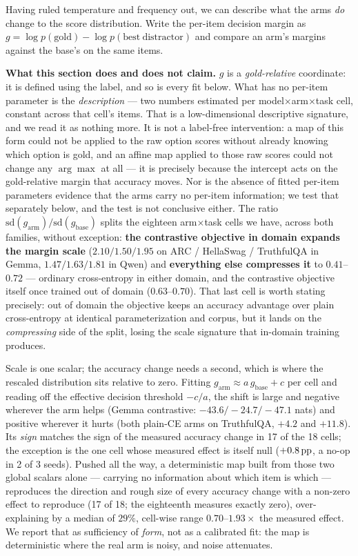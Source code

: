 Having ruled temperature and frequency out, we can describe what the arms \emph{do}
change to the score distribution. Write the per-item decision margin as
$g = \log p(\mathrm{gold}) - \log p(\mathrm{best\ distractor})$ and compare an arm's
margins against the base's on the same items.

\textbf{What this section does and does not claim.} $g$ is a \emph{gold-relative}
coordinate: it is defined using the label, and so is every fit below. What has no
per-item parameter is the \emph{description} --- two numbers estimated per
model${\times}$arm${\times}$task cell, constant across that cell's items. That is a
low-dimensional descriptive signature, and we read it as nothing more. It is not a
label-free intervention: a map of this form could not be applied to the raw option
scores without already knowing which option is gold, and an affine map applied to
those raw scores could not change any $\arg\max$ at all --- it is precisely because the
intercept acts on the gold-relative margin that accuracy moves. Nor is the absence of
fitted per-item parameters evidence that the arms carry no per-item information; we
test that separately below, and the test is not conclusive either. The ratio
$\mathrm{sd}(g_{\mathrm{arm}}) / \mathrm{sd}(g_{\mathrm{base}})$ splits the eighteen
arm${\times}$task cells we have, across both families, without exception:
\textbf{the contrastive objective in domain expands the margin scale}
($2.10 / 1.50 / 1.95$ on ARC / HellaSwag / TruthfulQA in Gemma,
$1.47 / 1.63 / 1.81$ in Qwen) and \textbf{everything else compresses it} to
$0.41$--$0.72$ --- ordinary cross-entropy in either domain, and the contrastive
objective itself once trained out of domain ($0.63$--$0.70$). That last cell is worth
stating precisely: out of domain the objective keeps an accuracy advantage over plain
cross-entropy at identical parameterization and corpus, but it lands on the
\emph{compressing} side of the split, losing the scale signature that in-domain
training produces.

Scale is one scalar; the accuracy change needs a second, which is where the rescaled
distribution sits relative to zero. Fitting
$g_{\mathrm{arm}} \approx a\,g_{\mathrm{base}} + c$ per cell and reading off the
effective decision threshold $-c/a$, the shift is large and negative wherever the arm
helps (Gemma contrastive: $-43.6 / -24.7 / -47.1$ nats) and positive wherever it hurts
(both plain-CE arms on TruthfulQA, $+4.2$ and $+11.8$). Its \emph{sign} matches the
sign of the measured accuracy change in 17 of the 18 cells; the exception is the one
cell whose measured effect is itself null ($+0.8\,\mathrm{pp}$, a no-op in 2 of 3 seeds). Pushed
all the way, a deterministic map built from those two global scalars alone --- carrying
no information about which item is which --- reproduces the direction and rough size of
every accuracy change with a non-zero effect to reproduce (17 of 18; the eighteenth
measures exactly zero), over-explaining by a median of $29\%$, cell-wise range
$0.70$--$1.93\times$ the measured effect. We report that as sufficiency of \emph{form},
not as a calibrated fit: the map is deterministic where the real arm is noisy, and
noise attenuates.

